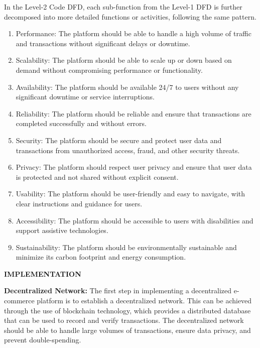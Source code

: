 \documentclass[a4paper,11pt]{article}
\begin{document}
\begin{center}
In the Level-2 Code DFD, each sub-function from the Level-1 DFD is further decomposed into more detailed functions or activities, following the same pattern.

\begin{enumerate}
    \item Performance: The platform should be able to handle a high volume of traffic and transactions without significant delays or downtime.
    \item Scalability: The platform should be able to scale up or down based on demand without compromising performance or functionality.
    \item Availability: The platform should be available 24/7 to users without any significant downtime or service interruptions.
    \item Reliability: The platform should be reliable and ensure that transactions are completed successfully and without errors.

    \item Security: The platform should be secure and protect user data and transactions from unauthorized access, fraud, and other security threats.
    \item Privacy: The platform should respect user privacy and ensure that user data is protected and not shared without explicit consent.
    \item Usability: The platform should be user-friendly and easy to navigate, with clear instructions and guidance for users.
    \item Accessibility: The platform should be accessible to users with disabilities and support assistive technologies.
    \item Sustainability: The platform should be environmentally sustainable and minimize its carbon footprint and energy consumption.
\end{enumerate}

\newpage


\begin{center}
    \textbf{\Large IMPLEMENTATION }
\end{center}
   \textbf{Decentralized Network:} 
The first step in implementing a decentralized e-commerce platform is to establish a decentralized network. This can be achieved through the use of blockchain technology, which provides a distributed database that can be used to record and verify transactions. The decentralized network should be able to handle large volumes of transactions, ensure data privacy, and prevent double-spending.


\end{center}
\end{document}

